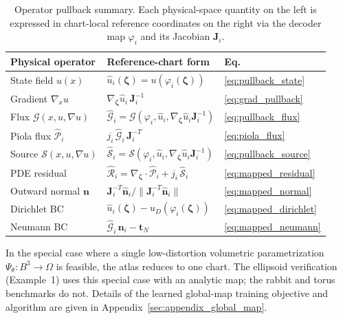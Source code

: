 \documentclass[sort&compress]{svjour3} %
\begin{document}
\begin{table}[htbp]
\centering
\caption{Operator pullback summary. Each physical-space quantity on the left is expressed in chart-local reference coordinates on the right via the decoder map $\varphi_i$ and its Jacobian $\mathbf{J}_i$.}
\label{tab:operator_map}
\smallskip
\small
\begin{tabular}{lll}
\toprule
Physical operator & Reference-chart form & Eq. \\
\midrule
State field $u(x)$ & $\widehat{u}_i(\boldsymbol{\zeta}) = u(\varphi_i(\boldsymbol{\zeta}))$ & \eqref{eq:pullback_state} \\
Gradient $\nabla_x u$ & $\nabla_{\boldsymbol{\zeta}}\widehat{u}_i\,\mathbf{J}_i^{-1}$ & \eqref{eq:grad_pullback} \\
Flux $\mathcal{G}(x,u,\nabla u)$ & $\widehat{\mathcal{G}}_i = \mathcal{G}(\varphi_i,\widehat{u}_i,\nabla_{\boldsymbol{\zeta}}\widehat{u}_i \mathbf{J}_i^{-1})$ & \eqref{eq:pullback_flux} \\
Piola flux $\widehat{\mathcal{P}}_i$ & $j_i\,\widehat{\mathcal{G}}_i\,\mathbf{J}_i^{-T}$ & \eqref{eq:piola_flux} \\
Source $\mathcal{S}(x,u,\nabla u)$ & $\widehat{\mathcal{S}}_i = \mathcal{S}(\varphi_i,\widehat{u}_i,\nabla_{\boldsymbol{\zeta}}\widehat{u}_i \mathbf{J}_i^{-1})$ & \eqref{eq:pullback_source} \\
PDE residual & $\widehat{\mathcal{R}}_i = \nabla_{\boldsymbol{\zeta}}\cdot\widehat{\mathcal{P}}_i + j_i\,\widehat{\mathcal{S}}_i$ & \eqref{eq:mapped_residual} \\
Outward normal $\mathbf{n}$ & $\mathbf{J}_i^{-T}\widehat{\mathbf{n}}_i / \|\mathbf{J}_i^{-T}\widehat{\mathbf{n}}_i\|$ & \eqref{eq:mapped_normal} \\
Dirichlet BC & $\widehat{u}_i(\boldsymbol{\zeta}) - u_D(\varphi_i(\boldsymbol{\zeta}))$ & \eqref{eq:mapped_dirichlet} \\
Neumann BC & $\widehat{\mathcal{G}}_i\,\mathbf{n}_i - \mathbf{t}_N$ & \eqref{eq:mapped_neumann} \\
\bottomrule
\end{tabular}
\end{table}



\begin{remark}
In the special case where a single low-distortion volumetric parametrization $\Psi_\theta:B^3\to\Omega$ is feasible, the atlas reduces to one chart. The ellipsoid verification (Example~1) uses this special case with an analytic map; the rabbit and torus benchmarks do not. Details of the learned global-map training objective and algorithm are given in Appendix~\ref{sec:appendix_global_map}.
\end{remark}
\end{document}
